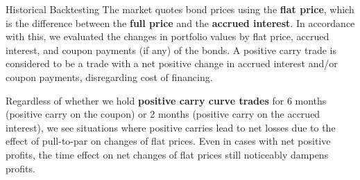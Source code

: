 \documentclass[final]{beamer}
\newlength{\colwidth}
\begin{document}
\begin{frame}[t]
\begin{columns}[t]
\begin{column}{\colwidth}
\begin{block}{Historical Backtesting}
The market quotes bond prices using the \textbf {flat price}, which is the difference between the \textbf{full price} and the \textbf{accrued interest}. In accordance with this, we evaluated the changes in portfolio values by flat price, accrued interest, and coupon payments (if any) of the bonds. A positive carry trade is considered to be a trade with a net positive change in accrued interest and/or coupon payments, disregarding cost of financing.

Regardless of whether we hold \textbf{positive carry curve trades} for 6 months (positive carry on the coupon) or 2 months (positive carry on the accrued interest), we see situations where positive carries lead to net losses due to the effect of pull-to-par on changes of flat prices. Even in cases with net positive profits, the time effect on net changes of flat prices still noticeably dampens profits.



\end{block}
\end{column}
\end{columns}
\end{frame}
\end{document}
